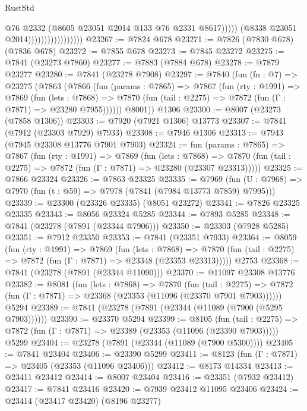 \begin{lexlean}{RustStd}
\begin{coremodule}
                                            @76
                                            @2332
                                            (@8605 @23051 @2014 @133 @76 @2331 @8617)))))
                                    (@8338 @23051 @2014)))))))))))))))))
@23267 := @7824 @678
@23271 := @7826 (@7830 @678) (@7836 @678)
@23272 := @7855 @678
@23273 := @7845 @23272
@23275 := @7841 (@23273 @7860)
@23277 := @7883 (@7884 @678)
@23278 := @7879 @23277
@23280 := @7841 (@23278 @7908)
@23297 := @7840
    (fun (fn : @7) =>
    @23275
      (@7863
        (@7866
          (fun (params : @7865) =>
          @7867
            (fun (rty : @1991) =>
            @7869
              (fun (lets : @7868) =>
              @7870 (fun (tail : @2275) => @7872 (fun (Γ : @7871) => @23280 @7955))))))
        @8001))
    @1306
@23300 := @8007 (@23273 (@7858 @1306))
@23303 := @7920 (@7921 @1306) @13773
@23307 := @7841 (@7912 (@23303 @7929) @7933)
@23308 := @7946 @1306
@23313 := @7943 (@7945 @23308 @13776 @7901 @7903)
@23324 := fun (params : @7865) =>
  @7867
    (fun (rty : @1991) =>
    @7869
      (fun (lets : @7868) =>
      @7870 (fun (tail : @2275) => @7872 (fun (Γ : @7871) => @23280 (@23307 @23313)))))
@23325 := @7866 @23324
@23326 := @7863 @23325
@23335 := @7969
    (fun (U : @7968) => @7970 (fun (t : @59) => @7978 (@7841 (@7984 @13773 @7859) @7995)))
@23339 := @23300 (@23326 @23335) (@8051 @23272)
@23341 := @7826 @23325 @23335
@23343 := @8056 @23324 @5285
@23344 := @7893 @5285
@23348 := @7841 (@23278 (@7891 (@23344 @7906)))
@23350 := @23303 (@7928 @5285)
@23351 := @7912 @23350
@23353 := @7841 (@23351 @7933)
@23364 := @8059
    (fun (rty : @1991) =>
    @7869
      (fun (lets : @7868) =>
      @7870 (fun (tail : @2275) => @7872 (fun (Γ : @7871) => @23348 (@23353 @23313)))))
    @2753
@23368 := @7841 (@23278 (@7891 (@23344 @11090)))
@23370 := @11097 @23308 @13776
@23382 := @8081
    (fun (lets : @7868) =>
    @7870
      (fun (tail : @2275) =>
      @7872 (fun (Γ : @7871) => @23368 (@23353 (@11096 (@23370 @7901 @7903))))))
    @5294
@23389 := @7841 (@23278 (@7891 (@23344 (@11089 (@7900 (@5295 @7903))))))
@23390 := @23370 @5294
@23399 := @8105
    (fun (tail : @2275) => @7872 (fun (Γ : @7871) => @23389 (@23353 (@11096 (@23390 @7903)))))
    @5299
@23404 := @23278 (@7891 (@23344 (@11089 (@7900 @5300))))
@23405 := @7841 @23404
@23406 := @23390 @5299
@23411 := @8123 (fun (Γ : @7871) => @23405 (@23353 (@11096 @23406)))
@23412 := @8173 @14334
@23413 := @23411 @23412
@23414 := @8007 @23404
@23416 := @23351 (@7932 @23412)
@23417 := @7841 @23416
@23420 := @7939 @23412 @11095 @23406
@23424 := @23414 (@23417 @23420) (@8196 @23277)

\end{coremodule}
\end{lexlean}

